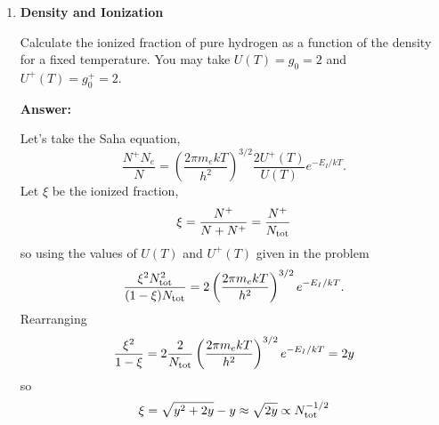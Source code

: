 \documentclass{article}
\newcommand{\rmscr}[1]{{\hbox{\rm \scriptsize #1}}}
\begin{document}
\begin{enumerate}
\item{\bf Density and Ionization}

Calculate the ionized fraction of pure hydrogen as a function of the
density for a fixed temperature.  You may take $U(T)=g_0=2$ and 
$U^+(T)=g_0^+=2$.

{\bf Answer:}

Let's take the Saha equation,
\begin{equation}
\frac{N^+ N_e}{N} = \left ( \frac{2\pi m_e kT}{h^2} \right)^{3/2}
\frac{2 U^+(T)}{U(T)} e^{-E_I/kT}.
\end{equation}
Let $\xi$ be the ionized fraction,
\begin{equation}
\xi = \frac{N^+}{N+N^+} = \frac{N^+}{N_\rmscr{tot}}
\end{equation}
so using the values of $U(T)$ and $U^+(T)$ given in the problem
\begin{equation}
\frac{\xi^2 N_\rmscr{tot}^2}{(1-\xi) N_\rmscr{tot}} = 2 \left ( \frac{2\pi m_e kT}{h^2} \right)^{3/2} e^{-E_I/kT}.
\end{equation}
Rearranging
\begin{equation}
\frac{\xi^2}{1-\xi} = 2 \frac{2}{N_\rmscr{tot}} \left ( \frac{2\pi m_e
    kT}{h^2} \right)^{3/2} e^{-E_I/kT} = 2 y
\end{equation}
so
\begin{equation}
\xi = \sqrt{y^2+2y} - y \approx \sqrt{2y} \propto N_\rmscr{tot}^{-1/2}
\end{equation}
\end{enumerate}
\ifx\bookloaded\undefined
\end{document}
